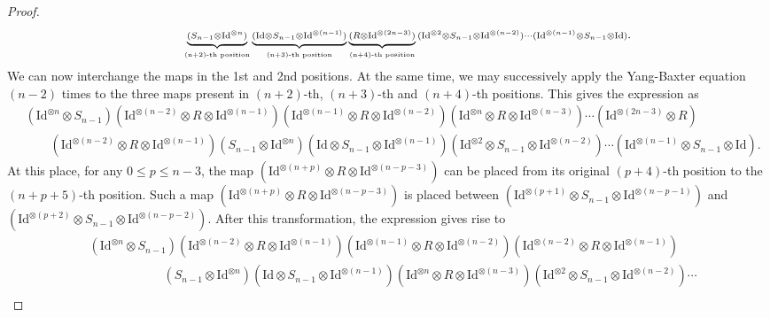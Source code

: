 \documentclass[a4paper,reqno,10pt]{amsart}
\theoremstyle{plain}
\theoremstyle{definition}
\theoremstyle{remark}
\begin{document}
\begin{proof}
\begin{align*}
    &\qquad\qquad  \underbrace{ {\scriptstyle  (S_{n-1}\otimes \mathrm{Id}^{\otimes n}) } }_{\mbox{\tiny(n+2)\text{\tiny-th position}}}  \underbrace{ {\scriptstyle (\mathrm{Id}\otimes S_{n-1}\otimes \mathrm{Id}^{\otimes(n-1)})   } }_{\mbox{\tiny(n+3)\text{\tiny-th position}}} \underbrace{ {\scriptstyle (R\otimes \mathrm{Id}^{\otimes(2n-3)})  } }_{\mbox{\tiny(n+4)\text{\tiny -th position}}}  {\scriptstyle (\mathrm{Id}^{\otimes 2}\otimes S_{n-1}\otimes \mathrm{Id}^{\otimes(n-2)})\cdots(\mathrm{Id}^{\otimes(n-1)}\otimes S_{n-1}\otimes \mathrm{Id}) }.
\end{align*}
We can now interchange the maps in the 1st and 2nd positions. At the same time, we may successively apply the Yang-Baxter equation $(n-2)$ times to the three maps present in $(n+2)$-th, $(n+3)$-th and $(n+4)$-th positions. This gives the expression as 
\begin{align*}
   & {\scriptstyle (\mathrm{Id}^{\otimes n}\otimes S_{n-1}) (\mathrm{Id}^{\otimes(n-2)}\otimes R\otimes \mathrm{Id}^{\otimes(n-1)})(\mathrm{Id}^{\otimes(n-1)}\otimes R\otimes \mathrm{Id}^{\otimes(n-2)})(\mathrm{Id}^{\otimes n}\otimes R\otimes \mathrm{Id}^{\otimes(n-3)})\cdots  (\mathrm{Id}^{\otimes (2n-3)}\otimes R) } \\
   & \qquad {\scriptstyle (\mathrm{Id}^{\otimes(n-2)}\otimes R\otimes \mathrm{Id}^{\otimes(n-1)})(S_{n-1}\otimes \mathrm{Id}^{\otimes n})(\mathrm{Id}\otimes S_{n-1}\otimes \mathrm{Id}^{\otimes(n-1)})(\mathrm{Id}^{\otimes 2}\otimes S_{n-1}\otimes \mathrm{Id}^{\otimes(n-2)})  \cdots(\mathrm{Id}^{\otimes(n-1)}\otimes S_{n-1}\otimes \mathrm{Id})  }.
\end{align*}
At this place, for any $0 \leq p \leq n-3$, the map $(\mathrm{Id}^{\otimes(n+p)}\otimes R\otimes\mathrm{Id}^{\otimes (n-p-3)})$ can be placed from its original $(p+4)$-th position to the $(n+p+5)$-th position. Such a map $(\mathrm{Id}^{\otimes(n+p)}\otimes R\otimes\mathrm{Id}^{\otimes (n-p-3)})$ is placed between 
$(\mathrm{Id}^{\otimes(p+1)}\otimes S_{n-1}\otimes \mathrm{Id}^{\otimes(n-p-1)})$ and $(\mathrm{Id}^{\otimes(p+2)}\otimes S_{n-1}\otimes \mathrm{Id}^{\otimes(n-p-2)})$. After this transformation, the expression gives rise to  
\begin{align*}
    &(\mathrm{Id}^{\otimes n}\otimes S_{n-1})(\mathrm{Id}^{\otimes (n-2)}\otimes R\otimes \mathrm{Id}^{\otimes(n-1)})(\mathrm{Id}^{\otimes (n-1)}\otimes R\otimes \mathrm{Id}^{\otimes(n-2)})(\mathrm{Id}^{\otimes (n-2)}\otimes R\otimes \mathrm{Id}^{\otimes(n-1)})\\
    &\qquad\qquad\qquad(S_{n-1}\otimes \mathrm{Id}^{\otimes n})(\mathrm{Id}\otimes S_{n-1}\otimes \mathrm{Id}^{\otimes(n-1)})(\mathrm{Id}^{\otimes n}\otimes R\otimes \mathrm{Id}^{\otimes(n-3)})(\mathrm{Id}^{\otimes 2}\otimes S_{n-1}\otimes \mathrm{Id}^{\otimes(n-2)})\cdots\\

\end{align*}
\end{proof}
\end{document}
